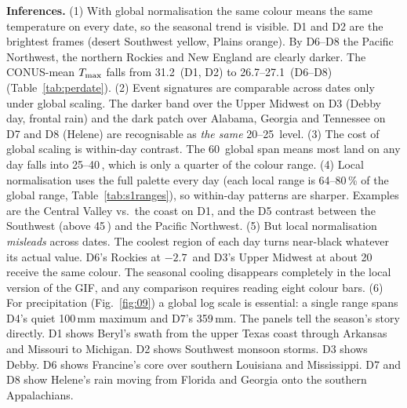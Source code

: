 




\textbf{Inferences.}
(1) With global normalisation the same colour means the same temperature on every date, so the seasonal trend is
visible. D1 and D2 are the brightest frames (desert Southwest yellow, Plains orange). By D6--D8 the Pacific Northwest, the
northern Rockies and New England are clearly darker. The CONUS-mean $T_{\max}$ falls from 31.2\,\degC{} (D1, D2) to
26.7--27.1\,\degC{} (D6--D8) (Table~\ref{tab:perdate}).
(2) Event signatures are comparable across dates only under global scaling. The darker band over the Upper Midwest on D3
(Debby day, frontal rain) and the dark patch over Alabama, Georgia and Tennessee on D7 and D8 (Helene) are recognisable
as \emph{the same} 20--25\,\degC{} level.
(3) The cost of global scaling is within-day contrast. The 60\,\degC{} global span means most land on any day falls into
25--40\,\degC, which is only a quarter of the colour range.
(4) Local normalisation uses the full palette every day (each local range is 64--80\,\% of the global range,
Table~\ref{tab:s1ranges}), so within-day patterns are sharper. Examples are the Central Valley vs.\ the coast on D1, and
the D5 contrast between the Southwest (above 45\,\degC) and the Pacific Northwest.
(5) But local normalisation \emph{misleads} across dates. The coolest region of each day turns near-black whatever its
actual value. D6's Rockies at $-2.7$\,\degC{} and D3's Upper Midwest at about 20\,\degC{} receive the same colour. The
seasonal cooling disappears completely in the local version of the GIF, and any comparison requires reading eight
colour bars.
(6) For precipitation (Fig.~\ref{fig:09}) a global log scale is essential: a single range spans D4's quiet 100\,mm maximum
and D7's 359\,mm. The panels tell the season's story directly. D1 shows Beryl's swath from the upper Texas coast through
Arkansas and Missouri to Michigan. D2 shows Southwest monsoon storms. D3 shows Debby. D6 shows Francine's core over
southern Louisiana and Mississippi. D7 and D8 show Helene's rain moving from Florida and Georgia onto the southern
Appalachians.

